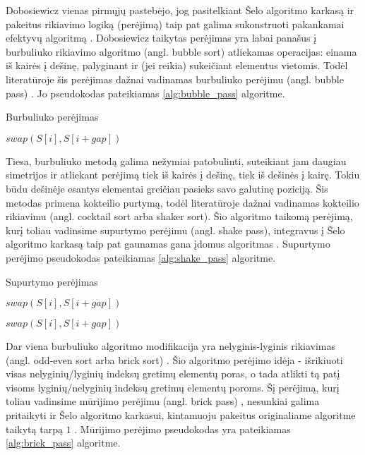 \documentclass{VUMIFInfKursinis}
\begin{document}
Dobosiewicz vienas pirmųjų pastebėjo, jog pasitelkiant
Šelo algoritmo karkasą ir pakeitus rikiavimo logiką (perėjimą) taip pat galima sukonstruoti pakankamai
efektyvų algoritmą \cite{dobosiewicz1980efficient}.
Dobosiewicz taikytas perėjimas yra labai panašus į burbuliuko rikiavimo algoritmo (angl. bubble sort) atliekamas operacijas:
einama iš kairės į dešinę, palyginant ir (jei reikia) sukeičiant elementus vietomis.
Todėl literatūroje šis perėjimas dažnai vadinamas burbuliuko perėjimu (angl. bubble pass) \cite{sedgewick1996analysis}.
Jo pseudokodas pateikiamas \ref{alg:bubble_pass} algoritme.

\begin{algorithm}[H]
  \caption{Burbuliuko perėjimas}\label{alg:bubble_pass}
  \begin{algorithmic}[1]
        \State $swap(S[i], S[i+gap])$
      \EndIf
    \EndFor
  \end{algorithmic}
\end{algorithm}

Tiesa, burbuliuko metodą galima nežymiai patobulinti, suteikiant jam daugiau simetrijos ir atliekant perėjimą
tiek iš kairės į dešinę, tiek iš dešinės į kairę.
Tokiu būdu dešinėje esantys elementai greičiau pasieks savo galutinę poziciją.
Šis metodas primena kokteilio purtymą, todėl literatūroje dažnai vadinamas kokteilio rikiavimu (angl. cocktail sort arba shaker sort).
Šio algoritmo taikomą perėjimą, kurį toliau vadinsime supurtymo perėjimu (angl. shake pass), integravus į Šelo algoritmo karkasą
taip pat gaunamas gana įdomus algoritmas \cite{incerpi1986practical}.
Supurtymo perėjimo pseudokodas pateikiamas \ref{alg:shake_pass} algoritme.

\begin{algorithm}[H]
  \caption{Supurtymo perėjimas}\label{alg:shake_pass}
  \begin{algorithmic}[1]
        \State $swap(S[i], S[i+gap])$
      \EndIf
    \EndFor

        \State $swap(S[i], S[i+gap])$
      \EndIf
    \EndFor
  \end{algorithmic}
\end{algorithm}

Dar viena burbuliuko algoritmo modifikacija yra nelyginis-lyginis rikiavimas (angl. odd-even sort arba brick sort) \cite{habermann1972parallel}.
Šio algoritmo perėjimo idėja - išrikiuoti visas nelyginių/lyginių indeksų gretimų elementų poras,
o tada atlikti tą patį visoms lyginių/nelyginių indeksų gretimų elementų poroms.
Šį perėjimą, kurį toliau vadinsime mūrijimo perėjimu (angl. brick pass) \cite{sedgewick1996analysis},
nesunkiai galima pritaikyti ir Šelo algoritmo karkasui, kintamuoju pakeitus originaliame algoritme taikytą tarpą $1$ \cite{lemke1994performance}.
Mūrijimo perėjimo pseudokodas yra pateikiamas \ref{alg:brick_pass} algoritme.
\end{document}
